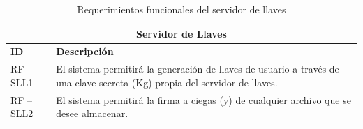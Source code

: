 \begin{table}[htb]
\centering
\begin{tabular}{| p{2cm} |  p{13.5cm} |}
\hline
\multicolumn{2}{|c|}{\textbf{Servidor de Llaves}} \\ \hline
\textbf{ID} &  \textbf{Descripción} \\
\hline \hline
RF – SLL1 & El sistema permitirá la generación de llaves de usuario a través de una clave secreta (Kg) propia del servidor de llaves. \\ \hline
RF – SLL2 & El sistema permitirá la firma a ciegas (y) de cualquier archivo que se desee almacenar. \\ \hline
\end{tabular}
\caption{Requerimientos funcionales del servidor de llaves}
\label{Servidor de Llaves }
\end{table}


